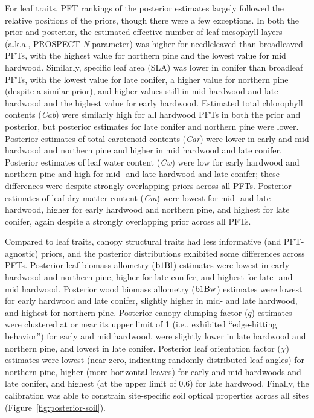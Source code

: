 For leaf traits, PFT rankings of the posterior estimates largely followed the relative positions of the priors, though there were a few exceptions.
In both the prior and posterior, the estimated effective number of leaf mesophyll layers (a.k.a., PROSPECT \emph{N} parameter) was higher for needleleaved than broadleaved PFTs, with the highest value for northern pine and the lowest value for mid hardwood.
Similarly, specific leaf area (SLA) was lower in conifer than broadleaf PFTs, with the lowest value for late conifer, a higher value for northern pine (despite a similar prior), and higher values still in mid hardwood and late hardwood and the highest value for early hardwood.
Estimated total chlorophyll contents (\emph{Cab}) were similarly high for all hardwood PFTs in both the prior and posterior,
but posterior estimates for late conifer and northern pine were lower.
Posterior estimates of total carotenoid contents (\emph{Car}) were lower in early and mid hardwood and northern pine and higher in mid hardwood and late conifer.
Posterior estimates of leaf water content (\emph{Cw}) were low for early hardwood and northern pine and high for mid- and late hardwood and late conifer; these differences were despite strongly overlapping priors across all PFTs.
Posterior estimates of leaf dry matter content (\emph{Cm}) were lowest for mid- and late hardwood, higher for early hardwood and northern pine, and highest for late conifer, again despite a strongly overlapping prior across all PFTs.

Compared to leaf traits, canopy structural traits had less informative (and PFT-agnostic) priors, and the posterior distributions exhibited some differences across PFTs.
Posterior leaf biomass allometry ($\mathrm{b1Bl}$) estimates were lowest in early hardwood and northern pine, higher for late conifer, and highest for late- and mid hardwood.
Posterior wood biomass allometry ($\mathrm{b1Bw}$) estimates were lowest for early hardwood and late conifer, slightly higher in mid- and late hardwood, and highest for northern pine.
Posterior canopy clumping factor ($q$) estimates were clustered at or near its upper limit of 1 (i.e., exhibited ``edge-hitting behavior'') for early and mid hardwood, were slightly lower in late hardwood and northern pine, and lowest in late conifer.
Posterior leaf orientation factor ($\chi$) estimates were lowest (near zero, indicating randomly distributed leaf angles) for northern pine, higher (more horizontal leaves) for early and mid hardwoods and late conifer, and highest (at the upper limit of 0.6) for late hardwood.
Finally, the calibration was able to constrain site-specific soil optical properties across all sites (Figure~\ref{fig:posterior-soil}).

